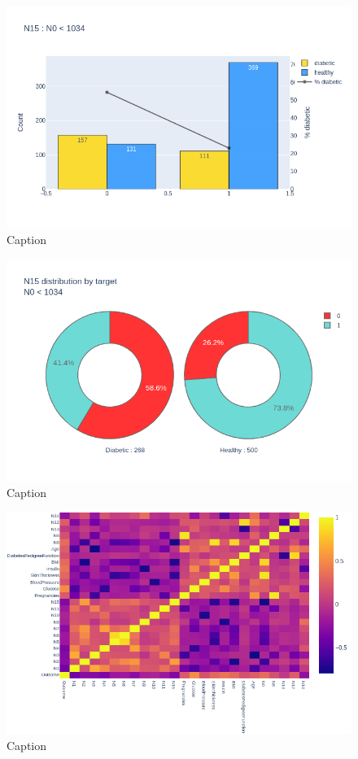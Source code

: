 \documentclass[12pt]{article}
\begin{document}
\begin{figure}[ht]
\centering
\includegraphics[width=1\textwidth]{newplot(40).png}
\caption{\label{fig:47} Caption}
\end{figure}

\begin{figure}[ht]
\centering
\includegraphics[width=1\textwidth]{newplot(41).png}
\caption{\label{fig:48} Caption}
\end{figure}

\begin{figure}[ht]
\centering
\includegraphics[width=1\textwidth]{newplot(42).png}
\caption{\label{fig:49} Caption}
\end{figure}
\end{document}
